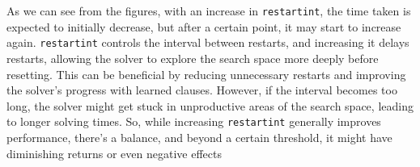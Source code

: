 \documentclass{article}
\begin{document}
    As we can see from the figures, with an increase in \texttt{restartint},
    the time taken is expected to initially decrease, but after a certain
    point, it may start to increase again. \texttt{restartint} controls the
    interval between restarts, and increasing it delays restarts, allowing the
    solver to explore the search space more deeply before resetting. This can
    be beneficial by reducing unnecessary restarts and improving the solver’s
    progress with learned clauses. However, if the interval becomes too long,
    the solver might get stuck in unproductive areas of the search space,
    leading to longer solving times. So, while increasing \texttt{restartint}
    generally improves performance, there’s a balance, and beyond a certain
    threshold, it might have diminishing returns or even negative effects
\end{document}
